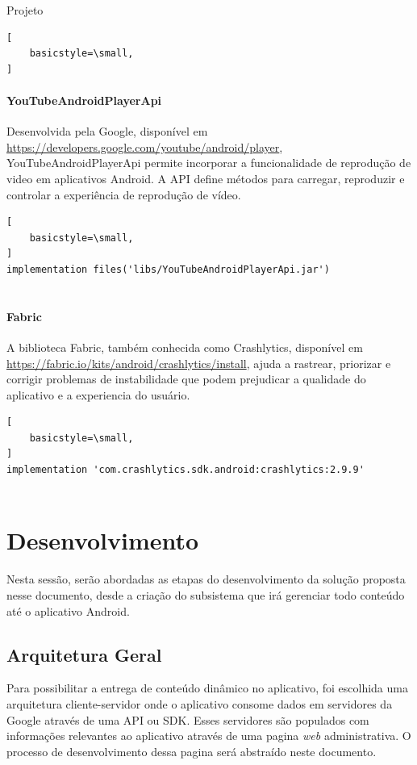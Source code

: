 \documentclass[
	12pt,				%
	openright,			%
	twoside,			%
	a4paper,			%
	english,			%
	french,				%
	spanish,			%
	brazil				%
	]{abntex2}
\begin{document}
\begin{chapter}{Projeto}
\begin{lstlisting}[
    basicstyle=\small,
]
\end{lstlisting}
   \paragraph{YouTubeAndroidPlayerApi}
   Desenvolvida pela Google, disponível em \url{https://developers.google.com/youtube/android/player}, YouTubeAndroidPlayerApi permite incorporar a funcionalidade de reprodução de video em aplicativos Android. A API  define métodos para carregar, reproduzir 
e controlar a experiência de reprodução de vídeo.
      \begin{lstlisting}[
    basicstyle=\small,
]
implementation files('libs/YouTubeAndroidPlayerApi.jar')
   
\end{lstlisting}
   \paragraph{Fabric}
   A biblioteca Fabric, também conhecida como Crashlytics, disponível em \url{https://fabric.io/kits/android/crashlytics/install}, ajuda a rastrear, priorizar e corrigir problemas de instabilidade que podem prejudicar a qualidade do aplicativo e a experiencia do usuário.
   \begin{lstlisting}[
    basicstyle=\small,
]
implementation 'com.crashlytics.sdk.android:crashlytics:2.9.9'
   
\end{lstlisting}


\section{Desenvolvimento}
Nesta sessão, serão abordadas as etapas do desenvolvimento da solução proposta nesse documento, desde a criação do subsistema que irá gerenciar todo conteúdo até o aplicativo Android. 

\subsection{Arquitetura Geral}
Para possibilitar a entrega de conteúdo dinâmico no aplicativo, foi escolhida uma arquitetura cliente-servidor onde o aplicativo consome dados em servidores da Google através de uma API ou SDK. Esses servidores são populados com informações relevantes ao aplicativo através de uma pagina \textit{web} administrativa. O processo de desenvolvimento dessa pagina será abstraído neste documento.\\



\end{chapter}
\end{document}
